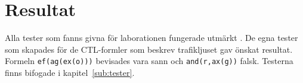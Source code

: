\section{Resultat}
\label{sub:test}

Alla tester som fanns givna för laborationen fungerade utmärkt \cite{labpm}. De egna tester som skapades för de CTL-formler som beskrev trafikljuset gav önskat resultat. Formeln \texttt{ef(ag(ex(o)))} bevisades vara sann och \texttt{and(r,ax(g))} falsk. Testerna finns bifogade i kapitel~\ref{sub:tester}.